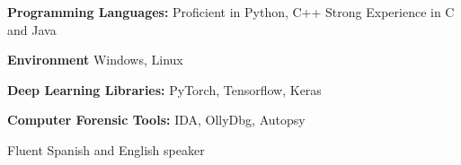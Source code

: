 \documentclass[12pt,a4paper,roman]{moderncv}        %
\makeatletter
\renewcommand*{\bibliographyitemlabel}{\@biblabel{\arabic{enumiv}}}
\makeatother
\begin{document}
\textbf{Programming Languages:} Proficient in Python, C++ Strong Experience in C and Java
\vspace{2pt}

\textbf{Environment} Windows, Linux
\vspace{2pt}
	
\textbf{Deep Learning Libraries:} PyTorch, Tensorflow, Keras
\vspace{2pt}
	
\textbf{Computer Forensic Tools:} IDA, OllyDbg, Autopsy
\vspace{2pt}
	
Fluent Spanish and English speaker
\vspace{2pt}

\nocite{*}



\end{document}
